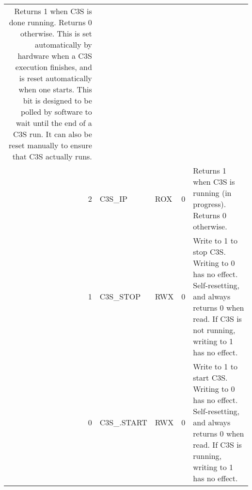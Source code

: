\begin{tabularx}{\textwidth}{r|l|l|l|X}
  Returns 1 when C3S is done running. Returns 0 otherwise. This is set
  automatically by hardware when a C3S execution finishes, and is
  reset automatically when one starts. This bit is designed to be
  polled by software to wait until the end of a C3S run. It can also
  be reset manually to ensure that C3S actually runs. \\

  2     & C3S\_IP             & ROX  & 0     &

  Returns 1 when C3S is running (in progress). Returns 0 otherwise. \\

  1     & C3S\_STOP           & RWX  & 0     &

  Write to 1 to stop C3S. Writing to 0 has no effect. Self-resetting,
  and always returns 0 when read. If C3S is not running, writing to 1
  has no effect. \\

  0     & C3S\_.START         & RWX  & 0     &

  Write to 1 to start C3S. Writing to 0 has no effect. Self-resetting,
  and always returns 0 when read. If C3S is running, writing to 1 has
  no effect. \\
\end{tabularx}

